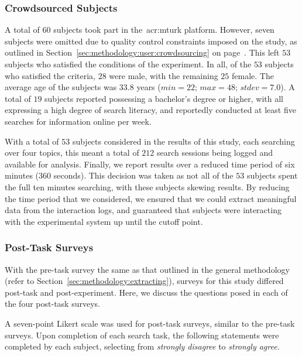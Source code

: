 \subsubsection{Crowdsourced Subjects}\label{sec:snippets:method:subjects}
A total of $60$ subjects took part in the~\gls{acr:mturk} platform. However, seven subjects were omitted due to quality control constraints imposed on the study, as outlined in Section~\ref{sec:methodology:user:crowdsourcing} on page~\pageref{sec:methodology:user:crowdsourcing}. This left $53$ subjects who satisfied the conditions of the experiment. In all, of the $53$ subjects who satisfied the criteria, $28$ were male, with the remaining $25$ female. The average age of the subjects was $33.8$ years ($min=22$; $max=48$; $stdev=7.0$). A total of $19$ subjects reported possessing a bachelor's degree or higher, with all expressing a high degree of search literacy, and reportedly conducted at least five searches for information online per week.

With a total of $53$ subjects considered in the results of this study, each searching over four topics, this meant a total of $212$ search sessions being logged and available for analysis. Finally, we report results over a reduced time period of six minutes ($360$ seconds). This decision was taken as not all of the $53$ subjects spent the full ten minutes searching, with these subjects skewing results. By reducing the time period that we considered, we ensured that we could extract meaningful data from the interaction logs, and guaranteed that subjects were interacting with the experimental system up until the cutoff point.

\subsubsection{Post-Task Surveys}\label{sec:snippets:method:posttask}
With the pre-task survey the same as that outlined in the general methodology (refer to Section~\ref{sec:methodology:extracting}), surveys for this study differed post-task and post-experiment. Here, we discuss the questions posed in each of the four post-task surveys.

A seven-point Likert scale was used for post-task surveys, similar to the pre-task surveys. Upon completion of each search task, the following statements were completed by each subject, selecting from \emph{strongly disagree} to \emph{strongly agree.}

